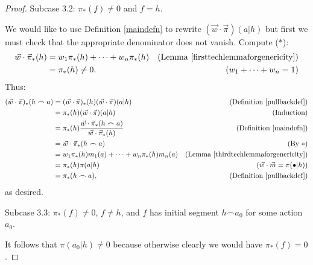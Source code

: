 \documentclass[runningheads]{llncs}
\begin{document}
\begin{proof}
    Subcase 3.2: $\pi_*(f)\not=0$ and $f=h$.

    We would like to use Definition \ref{maindefn} to rewrite
    $(\vec w\cdot\vec\pi)(a|h)$ but first we must check
    that the appropriate denominator does not vanish.
    Compute ($*$):
    \begin{align*}
        \vec w\cdot\vec\pi_*(h)
            &= w_1\pi_*(h)+\cdots+w_n\pi_*(h)
                &\mbox{(Lemma \ref{firsttechlemmaforgenericity})}\\
            &= \pi_*(h)\not=0.
                &\mbox{($w_1+\cdots+w_n=1$)}
    \end{align*}
    Thus:
    \begin{align*}
        (\vec w\cdot\vec\pi)_*(h\frown a)
            &= (\vec w\cdot\vec\pi)_*(h)
                (\vec w\cdot\vec\pi)(a|h)
                    &\mbox{(Definition \ref{pullbackdef})}\\
            &= \pi_*(h)(\vec w\cdot\vec\pi)(a|h)
                    &\mbox{(Induction)}\\
            &= \pi_*(h)
                \frac
                {\vec w\cdot\vec\pi_*(h\frown a)}
                {\vec w\cdot\vec\pi_*(h)}
                    &\mbox{(Definition \ref{maindefn})}\\
            &= \vec w\cdot\vec\pi_*(h\frown a)
                    &\mbox{(By $*$)}\\
            &= w_1\pi_*(h)m_1(a)+\cdots+w_n\pi_*(h)m_n(a)
                    &\mbox{(Lemma \ref{thirdtechlemmaforgenericity})}\\
            &= \pi_*(h)\pi(a|h)
                    &\mbox{($\vec w\cdot\vec m=\pi(\bullet|h)$)}\\
            &= \pi_*(h\frown a),
                    &\mbox{(Definition \ref{pullbackdef})}
    \end{align*}
    as desired.

    Subcase 3.3: $\pi_*(f)\not=0$, $f\not=h$, and
    $f$ has initial segment $h\frown a_0$ for some action $a_0$.

    It follows that $\pi(a_0|h)\not=0$ because otherwise clearly
    we would have $\pi_*(f)=0$.


\end{proof}
\end{document}
